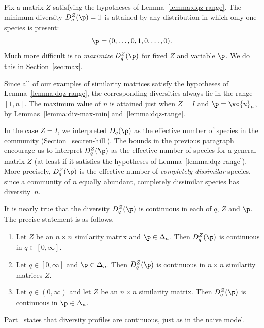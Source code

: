Fix a matrix $Z$ satisfying the hypotheses of Lemma~\ref{lemma:dqz-range}.
The minimum diversity $D_q^Z(\p) = 1$ is attained by any distribution in
which only one species is present:
\[
\p = (0, \ldots, 0, 1, 0, \ldots, 0).
\]
Much more difficult is to \emph{maximize} $D_q^Z(\p)$ for fixed $Z$ and
variable $\p$.  We do this in Section~\ref{sec:max}.

Since all of our examples of similarity matrices satisfy the hypotheses
of Lemma~\ref{lemma:dqz-range}, the corresponding diversities always lie in
the range $[1, n]$.  The maximum value of $n$ is attained just when $Z = I$
and $\p = \vc{u}_n$, by Lemmas~\ref{lemma:div-max-min}
and~\ref{lemma:dqz-range}. 

In the case $Z = I$, we interpreted $D_q(\p)$ as the effective number of
species in the community (Section~\ref{sec:ren-hill}).  The bounds in the
previous paragraph encourage us to interpret $D_q^Z(\p)$ as the effective%
%
%
number of species for a general matrix $Z$ (at least if it satisfies the
hypotheses of Lemma~\ref{lemma:dqz-range}).  More precisely, $D_q^Z(\p)$ is
the effective number of \emph{completely dissimilar} species,
since a community of $n$ equally abundant, completely dissimilar species
has diversity~$n$.

It is nearly true that the diversity $D_q^Z(\p)$ is continuous in each of
$q$, $Z$ and $\p$.  The precise statement is as follows.

\begin{lemma}
% 
\begin{enumerate}
\item 
{}
Let $Z$ be an $n \times n$ similarity matrix and $\p \in \Delta_n$.  Then
$D_q^Z(\p)$ is continuous in $q \in [0, \infty]$.

\item
{}
Let $q \in [0, \infty]$ and $\p \in \Delta_n$.  Then $D_q^Z(\p)$ is
continuous in $n \times n$ similarity matrices $Z$.

\item
{}
Let $q \in (0, \infty)$ and let $Z$ be an $n \times n$ similarity matrix.
Then $D_q^Z(\p)$ is continuous in $\p \in \Delta_n$.
\end{enumerate}
\end{lemma}

Part~ states that diversity profiles are continuous,
just as in the naive model.

